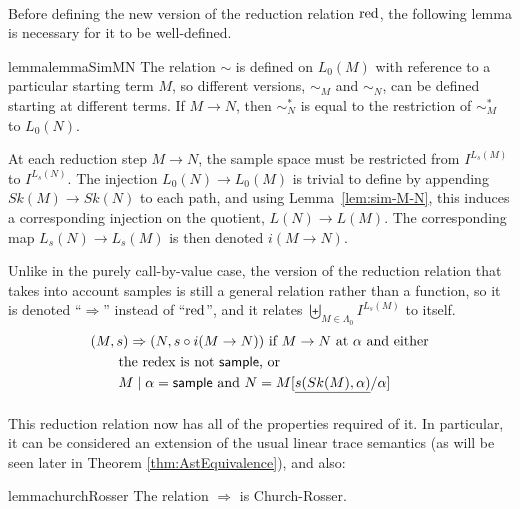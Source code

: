 \paragraph{}
Before defining the new version of the reduction relation $\operatorname{red}$, the following lemma is necessary for it to be well-defined.

\begin{restatable}{lemma}{lemmaSimMN}
\label{lem:sim-M-N}
The relation $\sim$ is defined on $L_0(M)$ with reference to a particular starting term $M$, so different versions, $\sim_M$ and $\sim_N$, can be defined starting at different terms. If $M \to N$, then $\sim^*_N$ is equal to the restriction of $\sim^*_M$ to $L_0(N)$.
\end{restatable} 


At each reduction step $M \to N$, the sample space must be restricted from $I^{L_s(M)}$ to $I^{L_s(N)}$. 
The injection $L_0(N) \to L_0(M)$ is trivial to define by appending $Sk(M) \to Sk(N)$ to each path, and using Lemma~\ref{lem:sim-M-N}, this induces a corresponding injection on the quotient, $L(N) \to L(M)$. 
The corresponding map $L_s(N) \to L_s(M)$ is then denoted $i(M \to N)$.

Unlike in the purely call-by-value case, the version of the reduction relation that takes into account samples is still a general relation rather than a function, so it is denoted ``$\Rightarrow$'' instead of ``$\operatorname{red}$'', and it relates $\biguplus_{M \in \Lambda_0} I^{L_s(M)}$ to itself.
\begin{align*}
& (M,s) \Rightarrow (N,s \circ i(M \to N)) \text{ if $M \to N$ at $\alpha$ and either} \\
& \qquad \text{the redex is not $\mathsf{sample}$, or} \\
& \qquad \text{$M \mid \alpha = \mathsf{sample}$ and $N = M[\underline{s(Sk(M),\alpha)}/\alpha]$}
\end{align*}

\paragraph{}
This reduction relation now has all of the properties required of it. In particular, it can be considered an extension of the usual linear trace semantics (as will be seen later in Theorem \ref{thm:AstEquivalence}), and also:
\begin{restatable}{lemma}{churchRosser} \label{churchRosser}
The relation $\Rightarrow$ is Church-Rosser.
\end{restatable}

